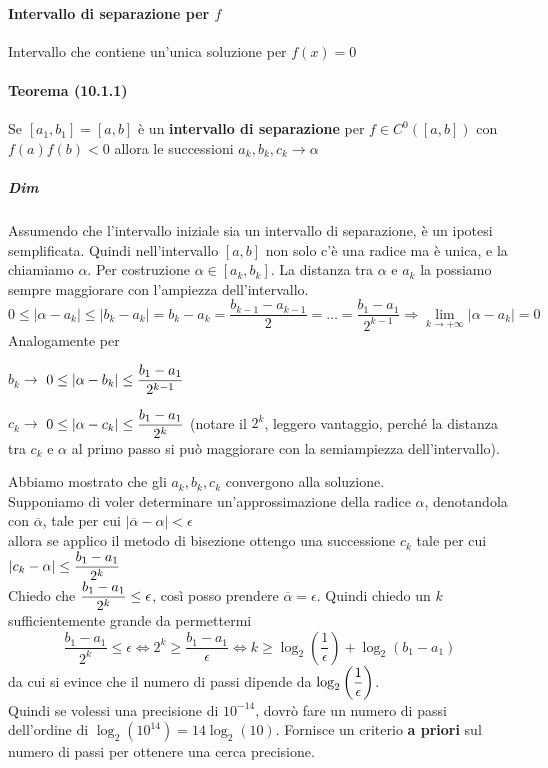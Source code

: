 \documentclass[10pt]{book}
\begin{document}
\paragraph{Intervallo di separazione per $f$} Intervallo che contiene un'unica soluzione per $f(x) = 0$
\paragraph{Teorema (10.1.1)} Se $[a_1, b_1] = [a, b]$ è un \textbf{intervallo di separazione} per $f \in C^0([a, b])$ con $f(a)f(b) < 0$ allora le successioni $a_k, b_k, c_k \longrightarrow \alpha$
\subparagraph{Dim} Assumendo che l'intervallo iniziale sia un intervallo di separazione, è un ipotesi semplificata. Quindi nell'intervallo $[a, b]$ non solo c'è una radice ma è unica, e la chiamiamo $\alpha$. Per costruzione $\alpha \in [a_k, b_k]$. La distanza tra $\alpha$ e $a_k$ la possiamo sempre maggiorare con l'ampiezza dell'intervallo.
$$0 \leq |\alpha - a_k| \leq |b_k - a_k| = b_k - a_k = \frac{b_{k-1} - a_{k-1}}{2} = \ldots = \frac{b_1 - a_1}{2^{k-1}} \Rightarrow \lim_{k\to +\infty} |\alpha - a_k| = 0$$
Analogamente per \begin{list}{}{}
	\item $b_k\rightarrow$ $0\leq |\alpha - b_k| \leq \mathlarger{\frac{b_1 - a_1}{2^{k-1}}}$
	\item $c_k\rightarrow$ $0\leq |\alpha - c_k| \leq \mathlarger{\frac{b_1 - a_1}{2^{k}}}$ (notare il $2^k$, leggero vantaggio, perché la distanza tra $c_k$ e $\alpha$ al primo passo si può maggiorare con la semiampiezza dell'intervallo).
\end{list}
Abbiamo mostrato che gli $a_k, b_k, c_k$ convergono alla soluzione.\\
Supponiamo di voler determinare un'approssimazione della radice $\alpha$, denotandola con $\overline{\alpha}$, tale per cui $|\overline{\alpha} - \alpha| < \epsilon$\\ allora se applico il metodo di bisezione ottengo una successione $c_k$ tale per cui $|c_k - \alpha| \leq \mathlarger{\frac{b_1 - a_1}{2^k}}$\\
Chiedo che $\mathlarger{\frac{b_1 - a_1}{2^k}} \leq \epsilon$, così posso prendere $\overline{\alpha} = \epsilon$. Quindi chiedo un $k$ sufficientemente grande da permettermi $$\frac{b_1 - a_1}{2^k} \leq \epsilon \Leftrightarrow 2^k \geq \frac{b_1 - a_1}{\epsilon} \Leftrightarrow k \geq \log_2\left(\frac{1}{\epsilon}\right) + \log_2\left(b_1 - a_1\right)$$
da cui si evince che il numero di passi dipende da $\log_2\left(\mathlarger{\frac{1}{\epsilon}}\right)$.\\
Quindi se volessi una precisione di $10^{-14}$, dovrò fare un numero di passi dell'ordine di $\log_2(10^{14}) = 14\log_2(10)$. Fornisce un criterio \textbf{a priori} sul numero di passi per ottenere una cerca precisione.
\end{document}
